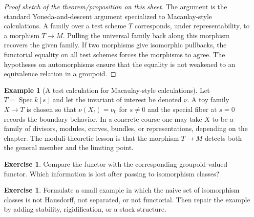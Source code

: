 \documentclass[11pt]{amsart}
\theoremstyle{definition}
\newtheorem{example}[theorem]{Example}
\newtheorem{exercise}[theorem]{Exercise}
\newcommand{\Spec}{\operatorname{Spec}}
\begin{document}
\begin{proof}[Proof sketch of the theorem/proposition on this sheet]
The argument is the standard Yoneda-and-descent argument specialized to Macaulay-style calculations.  A family over a test scheme $T$ corresponds, under representability, to a morphism $T\to M$.  Pulling the universal family back along this morphism recovers the given family.  If two morphisms give isomorphic pullbacks, the functorial equality on all test schemes forces the morphisms to agree.  The hypotheses on automorphisms ensure that the equality is not weakened to an equivalence relation in a groupoid.
\end{proof}
\begin{example}[A test calculation for Macaulay-style calculations]
Let $T=\Spec k[s]$ and let the invariant of interest be denoted $\nu$.  A toy family $X\to T$ is chosen so that $\nu(X_t)=\nu_0$ for $s\ne0$ and the special fiber at $s=0$ records the boundary behavior.  In a concrete course one may take $X$ to be a family of divisors, modules, curves, bundles, or representations, depending on the chapter.  The moduli-theoretic lesson is that the morphism $T\to M$ detects both the general member and the limiting point.
\end{example}
\begin{exercise}
Compare the functor with the corresponding groupoid-valued functor.  Which information is lost after passing to isomorphism classes?
\end{exercise}
\begin{exercise}
Formulate a small example in which the naive set of isomorphism classes is not Hausdorff, not separated, or not functorial.  Then repair the example by adding stability, rigidification, or a stack structure.
\end{exercise}
\clearpage
\end{document}

